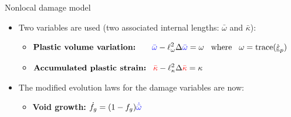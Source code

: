 \documentclass[9pt]{beamer}
\begin{document}

\begin{frame}{Nonlocal damage model}

	\begin{itemize}
		\item Two variables are used (two associated internal lengths: $\bar{\omega}$ and $\bar{\kappa}$):
		
		\vspace{0.15cm}
		
        \begin{itemize}

            \item $ \displaystyle \textbf{Plastic volume variation:} \hspace{0.7cm} \textcolor{blue}{\bar{\omega}} - \ell_{\omega}^2 \Delta \textcolor{blue}{\bar{\omega}} = \omega \hspace{0.3cm} \textrm{where} \hspace{0.3cm} \omega = \textrm{trace}(\dot{\underline{\varepsilon}}_p)$
            
            \vspace{0.3cm}
            
            \item $ \displaystyle \textbf{Accumulated plastic strain:} \hspace{0.3cm} \textcolor{red}{\bar{\kappa}} - \ell_{\kappa}^2 \Delta \textcolor{red}{\bar{\kappa}} = \kappa \hspace{3.6cm}$

        \end{itemize}
        
        \vspace{0.3cm}
        
		\item The modified evolution laws for the damage variables are now:
		
        \vspace{0.3cm}
        
        \begin{itemize}
        
            \item \textbf{Void growth:} \hspace{0.7cm} $ \displaystyle \dot{f_g} = (1-f_g) \textcolor{blue}{\dot{\bar{\omega}}} $
            
            \vspace{0.3cm}
            

\end{itemize}
\end{itemize}
\end{frame}
\end{document}
